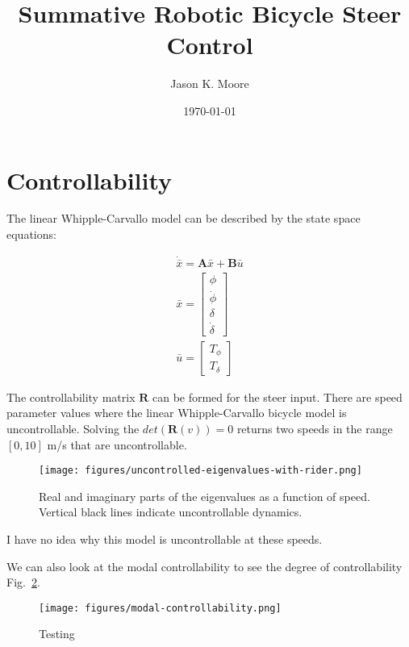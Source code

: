 \documentclass[12pt]{article}
\title{Summative Robotic Bicycle Steer Control}
\author{Jason K. Moore}
\date{\today}
\begin{document}
\maketitle

\section{Controllability}

The linear Whipple-Carvallo model can be described by the state space
equations:

\begin{align}
  \dot{\bar{x}} = \mathbf{A} \bar{x} + \mathbf{B} \bar{u} \\
  \bar{x} = \begin{bmatrix} \phi \\ \dot{\phi} \\ \delta \\ \dot{\delta}
  \end{bmatrix} \\
  \bar{u} = \begin{bmatrix} T_{\phi} \\ T_{\delta} \end{bmatrix}
\end{align}

The controllability matrix \(\mathbf{R}\) can be formed for the steer input.
There are speed parameter values where the linear Whipple-Carvallo bicycle
model is uncontrollable. Solving the \(det(\mathbf{R}(v))=0\) returns two
speeds in the range \([0, 10]\) m/s that are uncontrollable.

\begin{figure}
  \centering
  \texttt{[image: figures/uncontrolled-eigenvalues-with-rider.png]}
  \caption{Real and imaginary parts of the eigenvalues as a function of speed.
  Vertical black lines indicate uncontrollable dynamics.}
  \label{fig:uncontrolled-eigenvalues-with-rider}
\end{figure}

I have no idea why this model is uncontrollable at these speeds.

We can also look at the modal controllability to see the degree of
controllability Fig.~\ref{fig:modal-controllability}.

\begin{figure}
  \centering
  \texttt{[image: figures/modal-controllability.png]}
  \caption{Testing}
  \label{fig:modal-controllability}
\end{figure}
\end{document}
